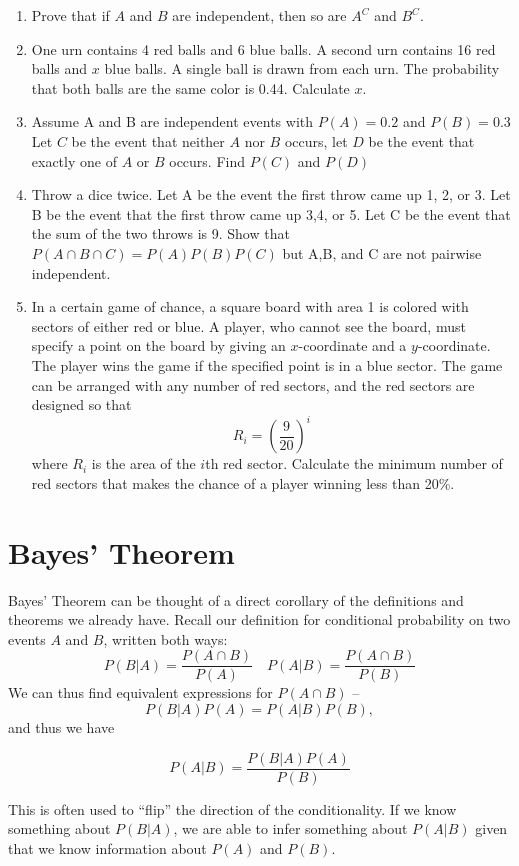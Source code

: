 \documentclass[../main.tex]{subfiles}
\begin{document}
{\begin{enumerate}
	\item Prove that if $A$ and $B$ are independent, then so are $A^C$ and $B^C$.
	
	\item One urn contains 4 red balls and 6 blue balls. A second urn contains 16 red
	balls and $x$ blue balls. A single ball is drawn from each urn. The probability
	that both balls are the same color is 0.44.
	Calculate $x$.
	
	\item Assume A and B are independent events with $P(A) = 0.2$ and $P(B) = 0.3$
	Let $C$ be the event that neither $A$ nor $B$ occurs, let $D$ be the event that
	exactly one of $A$ or $B$ occurs. Find $P(C)$ and $P(D)$
	
	\item Throw a dice twice. Let A be the event the first throw came up 1, 2, or 3. Let
	B be the event that the first throw came up 3,4, or 5. Let C be the event that
	the sum of the two throws is 9. Show that $P(A \cap B \cap C) = P(A)P(B)P(C)$
	but A,B, and C are not pairwise independent.
	
	\item In a certain game of chance, a square board with area 1 is colored with sectors
	of either red or blue. A player, who cannot see the board, must specify a
	point on the board by giving an $x$-coordinate and a $y$-coordinate. The
	player wins the game if the specified point is in a blue sector. The game can
	be arranged with any number of red sectors, and the red sectors are designed
	so that
	$$R_i = \left( \dfrac{9}{20} \right) ^ i$$
	where $R_i$ is the area of the $i$th red sector.
	Calculate the minimum number of red sectors that makes the chance of a
	player winning less than 20\%.
\end{enumerate}
}

\section{Bayes' Theorem}
Bayes' Theorem can be thought of a direct corollary of the definitions and theorems we already have. Recall our definition for conditional probability on two events $A$ and $B$, written both ways:
\[
	P(B|A) = \frac{P(A\cap B)}{P(A)} \quad P(A|B) = \frac{P(A\cap B)}{P(B)}
\]
We can thus find equivalent expressions for $P(A \cap B)$ --
\[
	P(B|A) P(A) = P(A|B) P(B),
\]
and thus we have
\begin{theorem}
\[P(A|B) = \frac{P(B|A) P(A)}{P(B)} \]
\end{theorem}
This is often used to ``flip'' the direction of the conditionality. If we know something about $P(B|A)$, we are able to infer something about $P(A|B)$ given that we know information about $P(A)$ and $P(B)$. 
\end{document}
